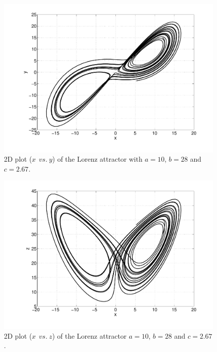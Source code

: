 \begin{multicols}{2}

\begin{figure}[H]
\centering
\includegraphics[scale=0.3, trim = 20mm 0mm 0mm 0mm, clip]
{./Figures/2-CauchyProblem/lorentz_xy.pdf}  \caption{2D plot ($x \:\: vs. \:
y$) of the Lorenz attractor with $a=10$, $b=28$ and $c=2.67$.} 
\end{figure}

\columnbreak

\begin{figure}[H]
\centering
\includegraphics[scale=0.3, trim = 20mm 0mm 0mm 0mm, clip]
{./Figures/2-CauchyProblem/lorentz_xz.pdf}
\caption{2D plot ($x \:\: vs. \: z$) of the Lorenz attractor $a=10$,
$b=28$ and $c=2.67$.}
\end{figure}

\end{multicols}

